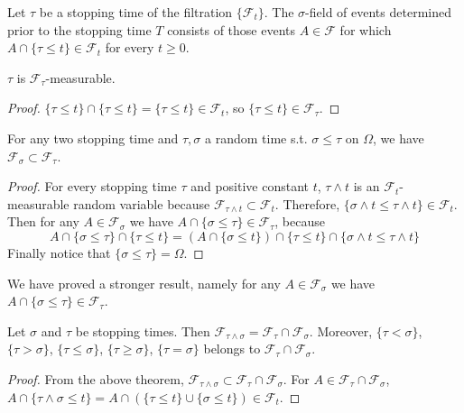 \begin{definition}
    Let $\tau$ be a stopping time of the filtration $\{\mathcal{F}_t\}$. The $\sigma$-field of events determined prior to the stopping time $T$
    consists of those events $A\in\mathcal{F}$ for which $A\cap\{\tau\leq t\}\in \mathcal{F}_t$ for every $t\geq 0$.
\end{definition}
\begin{lemma}
    $\tau$ is $\mathcal{F}_\tau$-measurable.
\end{lemma}
\begin{proof}
    $\{\tau\leq t\}\cap\{\tau\leq t\}=\{\tau\leq t\}\in\mathcal{F}_t$, so $\{\tau\leq t\}\in \mathcal{F}_\tau$.
\end{proof}

\begin{theorem}
    For any two stopping time and $\tau,\sigma$ a random time s.t. $\sigma\leq \tau$ on $\Omega$, we have $\mathcal{F}_\sigma\subset\mathcal{F}_\tau$.
\end{theorem}
\begin{proof}
    For every stopping time $\tau$ and positive constant $t$, $\tau\wedge t$ is an $\mathcal{F}_t$-measurable random variable
    because $\mathcal{F}_{\tau\wedge t}\subset\mathcal{F}_t$. Therefore, $\{\sigma\wedge t\leq \tau\wedge t\}\in \mathcal{F}_t$.
    Then for any $A\in\mathcal{F}_\sigma$ we have $A\cap\{\sigma\leq \tau\}\in\mathcal{F}_\tau$, because
    \[ A\cap\{\sigma\leq \tau\}\cap \{\tau\leq t\}= (A\cap \{\sigma\leq t\})\cap \{\tau\leq t\}\cap \{\sigma\wedge t\leq \tau\wedge t\}\]
    Finally notice that $\{\sigma\leq \tau\}=\Omega$.
\end{proof}
\begin{remark}
    We have proved a stronger result, namely
    for any $A\in\mathcal{F}_\sigma$ we have $A\cap\{\sigma\leq \tau\}\in\mathcal{F}_\tau$.
\end{remark}
\begin{theorem}
    Let $\sigma$ and $\tau$ be stopping times. Then $\mathcal{F}_{\tau\wedge \sigma}=\mathcal{F}_\tau\cap\mathcal{F}_\sigma$.\newline 
    Moreover, $\{\tau<\sigma\}$, $\{\tau>\sigma\}$, $\{\tau\leq \sigma\}$, $\{\tau\geq \sigma\}$, $\{\tau=\sigma\}$ belongs to $\mathcal{F}_\tau\cap\mathcal{F}_\sigma$.
\end{theorem}
\begin{proof}
    From the above theorem, $\mathcal{F}_{\tau\wedge \sigma}\subset \mathcal{F}_{\tau}\cap\mathcal{F}_\sigma$.\newline 
    For $A\in \mathcal{F}_{\tau}\cap\mathcal{F}_\sigma$, $A\cap \{\tau\wedge \sigma\leq t\}=A\cap(\{\tau\leq t\}\cup\{\sigma\leq t\})\in\mathcal{F}_t$.
\end{proof}

